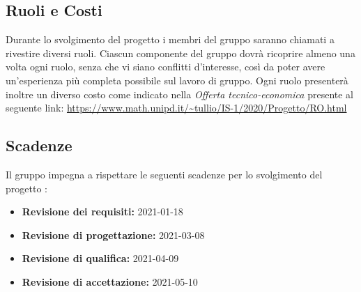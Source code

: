 \subsection{Ruoli e Costi}
Durante lo svolgimento del progetto i membri del gruppo \Gruppo saranno chiamati a rivestire diversi ruoli. Ciascun componente del gruppo dovrà ricoprire almeno una volta ogni ruolo, senza che vi siano conflitti d'interesse, così da poter avere un'esperienza più completa possibile sul lavoro di gruppo. Ogni ruolo presenterà inoltre un diverso costo come indicato nella \textit{Offerta tecnico-economica} presente al seguente link: \url{https://www.math.unipd.it/~tullio/IS-1/2020/Progetto/RO.html}

\subsection{Scadenze}
Il gruppo \Gruppo impegna a rispettare le seguenti scadenze per lo svolgimento del
progetto \NomeProgetto:

\begin{itemize}
    \item \textbf{Revisione dei requisiti:} 2021-01-18
    \item \textbf{Revisione di progettazione:} 2021-03-08
    \item \textbf{Revisione di qualifica:} 2021-04-09
    \item \textbf{Revisione di accettazione:} 2021-05-10
\end{itemize}

